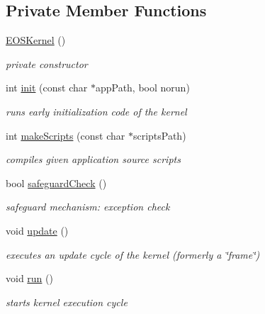 \subsection*{Private Member Functions}
\begin{CompactItemize}
\item 
\hyperlink{structEOSKernel_06b0f1294a41e6203f303991ccfd9f56}{EOSKernel} ()
\begin{CompactList}\small\item\em private constructor \item\end{CompactList}\item 
int \hyperlink{structEOSKernel_04741bac06a4289eeaa252290c9ea48f}{init} (const char $\ast$appPath, bool norun)
\begin{CompactList}\small\item\em runs early initialization code of the kernel \item\end{CompactList}\item 
int \hyperlink{structEOSKernel_d6091282d486d45fe2c243510031ad32}{makeScripts} (const char $\ast$scriptsPath)
\begin{CompactList}\small\item\em compiles given application source scripts \item\end{CompactList}\item 
bool \hyperlink{structEOSKernel_13844b7aae15bf38e0ceca3a5be52b9b}{safeguardCheck} ()
\begin{CompactList}\small\item\em safeguard mechanism: exception check \item\end{CompactList}\item 
void \hyperlink{structEOSKernel_29d304241dfe47c34d782b0b93a6b986}{update} ()
\begin{CompactList}\small\item\em executes an update cycle of the kernel (formerly a \char`\"{}frame\char`\"{}) \item\end{CompactList}\item 
void \hyperlink{structEOSKernel_2659cec44279505b550ab273010cb6b9}{run} ()
\begin{CompactList}\small\item\em starts kernel execution cycle \item\end{CompactList}\item 

\end{CompactItemize}
